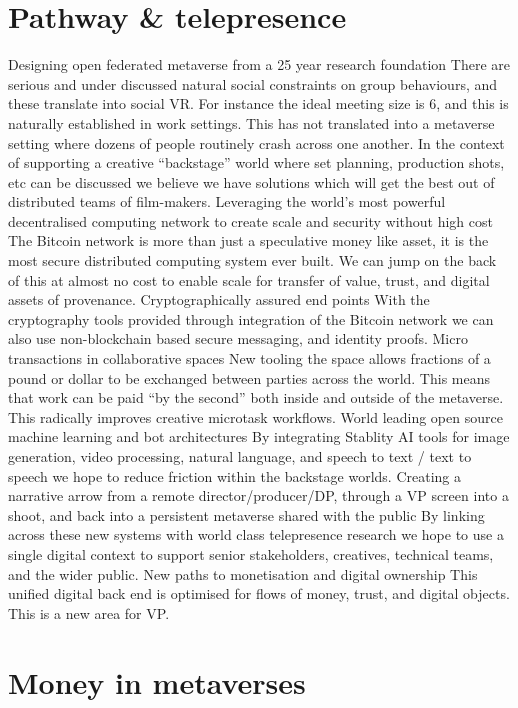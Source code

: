 \section{Pathway \& telepresence}
Designing open federated metaverse from a 25 year research foundation
There are serious and under discussed natural social constraints on group behaviours, and these translate into social VR. For instance the ideal meeting size is 6, and this is naturally established in work settings. This has not translated into a metaverse setting where dozens of people routinely crash across one another. In the context of supporting a creative “backstage” world where set planning, production shots, etc can be discussed we believe we have solutions which will get the best out of distributed teams of film-makers.
Leveraging the world's most powerful decentralised computing network to create 
scale and security without high cost
The Bitcoin network is more than just a speculative money like asset, it is the most secure distributed computing system ever built. We can jump on the back of this at almost no cost to enable scale for transfer of value, trust, and digital assets of provenance.
Cryptographically assured end points
With the cryptography tools provided through integration of the Bitcoin network we can also use non-blockchain based secure messaging, and identity proofs. 
Micro transactions in collaborative spaces
New tooling the space allows fractions of a pound or dollar to be exchanged between parties across the world. This means that work can be paid “by the second” both inside and outside of the metaverse. This radically improves creative microtask workflows.
World leading open source machine learning and bot architectures
By integrating Stablity AI tools for image generation, video processing, natural language, and speech to text / text to speech we hope to reduce friction within the backstage worlds.
Creating a narrative arrow from a remote director/producer/DP, through a VP screen into a shoot, and back into a persistent metaverse shared with the public
By linking across these new systems with world class telepresence research we hope to use a single digital context to support senior stakeholders, creatives, technical teams, and the wider public.
New paths to monetisation and digital ownership
This unified digital back end is optimised for flows of money, trust, and digital objects. This is a new area for VP.

\section{Money in metaverses}
